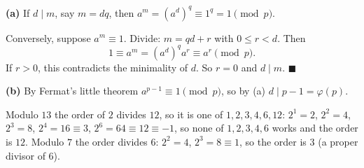 \textbf{(a)} If $d\mid m$, say $m=dq$, then $a^m=\left(a^d\right)^q\equiv1^q=1\pmod p$.

Conversely, suppose $a^m\equiv1$. Divide: $m=qd+r$ with $0\le r<d$. Then
\[1\equiv a^m=\left(a^d\right)^q a^r\equiv a^r\pmod p .\]
If $r>0$, this contradicts the minimality of $d$. So $r=0$ and $d\mid m$. $\blacksquare$

\textbf{(b)} By Fermat's little theorem $a^{p-1}\equiv1\pmod p$, so by (a) $d\mid p-1=\varphi(p)$.

Modulo $13$ the order of $2$ divides $12$, so it is one of $1,2,3,4,6,12$: $2^1=2$, $2^2=4$, $2^3=8$, $2^4=16\equiv3$, $2^6=64\equiv12\equiv-1$, so none of $1,2,3,4,6$ works and the order is $\boxed{12}$. Modulo $7$ the order divides $6$: $2^2=4$, $2^3=8\equiv1$, so the order is $\boxed{3}$ (a proper divisor of $6$).

